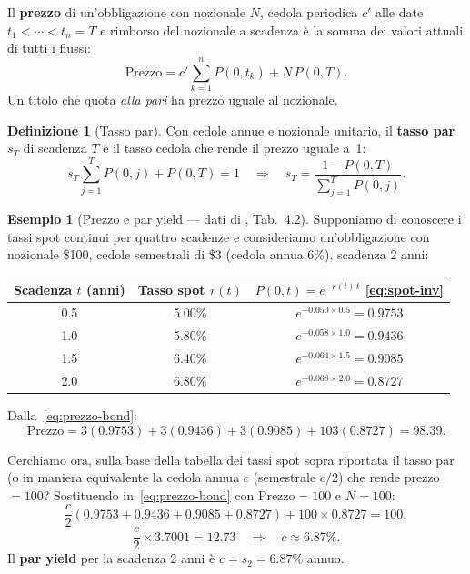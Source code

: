 \documentclass[11pt,a4paper]{article}
\theoremstyle{plain}
\theoremstyle{definition}
\newtheorem{definizione}[teorema]{Definizione}
\newtheorem{esempio}[teorema]{Esempio}
\theoremstyle{remark}
\begin{document}
Il \textbf{prezzo} di un'obbligazione con nozionale $N$, cedola periodica $c'$ alle
date $t_1 < \cdots < t_n = T$ e rimborso del nozionale a scadenza \`e la somma dei valori
attuali di tutti i flussi:
\begin{equation}
  \text{Prezzo} = c' \sum_{k=1}^{n} P(0,t_k) + N\,P(0,T).
  \label{eq:prezzo-bond}
\end{equation}
Un titolo che quota \emph{alla pari} ha prezzo uguale al nozionale.
\begin{definizione}[Tasso par]
\label{def:par}
Con cedole annue e nozionale unitario, il \textbf{tasso par} $s_T$ di scadenza $T$ \`e
il tasso cedola che rende il prezzo uguale a~1:
\[
  s_T \sum_{j=1}^{T} P(0,j) + P(0,T) = 1
  \quad\Longrightarrow\quad
  s_T = \frac{1 - P(0,T)}{\displaystyle\sum_{j=1}^{T} P(0,j)}.
\]
\end{definizione}
\begin{esempio}[Prezzo e par yield --- dati di \cite{hull2018}, Tab.~4.2]
\label{ex:hull42}
Supponiamo di conoscere i tassi spot continui per quattro scadenze e consideriamo un'obbligazione con nozionale \$100, cedole semestrali di \$3 (cedola
annua 6\%), scadenza 2 anni:
\begin{center}\small
\renewcommand{\arraystretch}{1.2}
\begin{tabular}{ccc}
\toprule
Scadenza $t$ (anni) & Tasso spot $r(t)$ & $P(0,t) = e^{-r(t)\,t}$ \eqref{eq:spot-inv} \\
\midrule
0.5 & 5.00\% & $e^{-0.050\times 0.5} = 0.9753$ \\
1.0 & 5.80\% & $e^{-0.058\times 1.0} = 0.9436$ \\
1.5 & 6.40\% & $e^{-0.064\times 1.5} = 0.9085$ \\
2.0 & 6.80\% & $e^{-0.068\times 2.0} = 0.8727$ \\
\bottomrule
\end{tabular}
\end{center}

 Dalla~\eqref{eq:prezzo-bond}:
\[
  \text{Prezzo}
  = 3(0.9753) + 3(0.9436) + 3(0.9085) + 103(0.8727)
  = 98.39.
\]

Cerchiamo ora, sulla base della tabella dei tassi spot sopra riportata il tasso par (o in maniera equivalente la cedola annua $c$ (semestrale $c/2$) che rende prezzo $= 100$?
Sostituendo in~\eqref{eq:prezzo-bond} con $\text{Prezzo}=100$ e $N=100$:
\[
  \frac{c}{2}(0.9753 + 0.9436 + 0.9085 + 0.8727) + 100\times 0.8727 = 100,
\]
\[
  \frac{c}{2}\times 3.7001 = 12.73
  \quad\Longrightarrow\quad
  c \approx 6.87\%.
\]
Il \textbf{par yield} per la scadenza 2 anni \`e $c = s_2 = 6.87\%$ annuo.%
\end{esempio}
\end{document}
